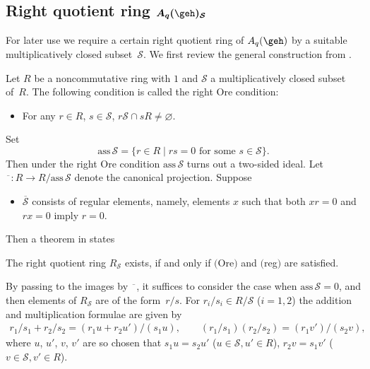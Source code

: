 \subsection[Right quotient ring $A_q(\geh)_\mathcal{S}$]{Right quotient ring $\boldsymbol{A_q(\geh)_\mathcal{S}}$}

For later use we require a certain right quotient ring of $A_q(\geh)$ by a suitable multiplicatively
closed subset~$\mathcal{S}$. We f\/irst review the general construction from \cite[Chapter~2]{McCoRob}.

Let $R$ be a noncommutative ring with $1$ and $\mathcal{S}$ a multiplicatively closed subset of~$R$.
The following condition is called the right Ore condition:
\begin{itemize}\itemsep=0pt
\item[(Ore)] For any $r\in R$, $s\in\mathcal{S}$, $r\mathcal{S}\cap sR\neq\varnothing$.
\end{itemize}
Set
\[
\mathrm{ass}\,\mathcal{S}=\{r\in R\mid rs=0\mbox{ for some }s\in\mathcal{S}\}.
\]
Then under the right Ore condition $\mathrm{ass}\,\mathcal{S}$ turns out a two-sided ideal.
Let $\overline{\phantom{a}}:R\rightarrow R/\mathrm{ass}\,\mathcal{S}$ denote the canonical projection.
Suppose
\begin{itemize}\itemsep=0pt
\item[(reg)] $\overline{\mathcal{S}}$ consists of regular elements, namely, elements $x$ such that
both $xr=0$ and $rx=0$ imply $r=0$.
\end{itemize}
Then a theorem in \cite[Chapter~2]{McCoRob} states

\begin{theorem} \label{th:McCoRob}
The right quotient ring $R_\mathcal{S}$ exists, if and only if $($Ore$)$ and $($reg$)$ are satisfied.
\end{theorem}

By passing to the images by $\overline{\phantom{a}}$, it suf\/f\/ices to consider the case when
$\mathrm{ass}\,\mathcal{S}=0$, and then elements of $R_\mathcal{S}$ are of the form~$r/s$.
For $r_i/s_i\in R/\mathcal{S}$ ($i=1,2$) the addition and multiplication formulae are given by
\begin{gather}\label{add-mult}
r_1/s_1+r_2/s_2=(r_1u+r_2u')/(s_1u),\qquad (r_1/s_1)(r_2/s_2)=(r_1v')/(s_2v),
\end{gather}
where $u$, $u'$, $v$, $v'$ are so chosen that $s_1u=s_2u'$ ($u\in\mathcal{S},u'\in R$), $r_2v=s_1v'$
($v\in\mathcal{S},v'\in R$).

